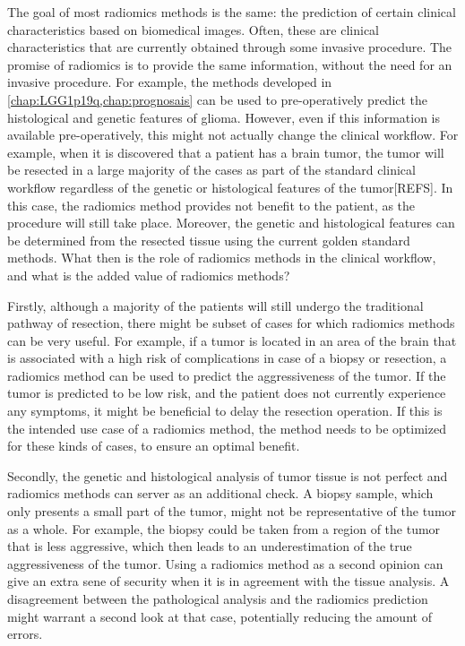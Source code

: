 The goal of most radiomics methods is the same: the prediction of certain clinical characteristics based on biomedical images.
Often, these are clinical characteristics that are currently obtained through some invasive procedure.
The promise of radiomics is to provide the same information, without the need for an invasive procedure.
For example, the methods developed in \cref{chap:LGG1p19q,chap:prognosais} can be used to pre-operatively predict the histological and genetic features of glioma.
However, even if this information is available pre-operatively, this might not actually change the clinical workflow.
For example, when it is discovered that a patient has a brain \gls{tumor}, the tumor will be resected in a large majority of the cases as part of the standard clinical workflow regardless of the genetic or histological features of the tumor[REFS].
In this case, the radiomics method provides not benefit to the patient, as the procedure will still take place.
Moreover, the genetic and histological features can be determined from the resected tissue using the current golden standard methods.
What then is the role of radiomics methods in the clinical workflow, and what is the added value of radiomics methods?

Firstly, although a majority of the patients will still undergo the traditional pathway of resection, there might be subset of cases for which radiomics methods can be very useful.
For example, if a \gls{tumor} is located in an area of the brain that is associated with a high risk of complications in case of a biopsy or resection, a radiomics method can be used to predict the aggressiveness of the \gls{tumor}.
If the \gls{tumor} is predicted to be low risk, and the patient does not currently experience any symptoms, it might be beneficial to delay the resection operation.
If this is the intended use case of a radiomics method, the method needs to be optimized for these kinds of cases, to ensure an optimal benefit.

Secondly, the genetic and histological analysis of \gls{tumor} tissue is not perfect and radiomics methods can server as an additional check.
A biopsy sample, which only presents a small part of the \gls{tumor}, might not be representative of the \gls{tumor} as a whole.
For example, the biopsy could be taken from a region of the tumor that is less aggressive, which then leads to an underestimation of the true aggressiveness of the \gls{tumor}.
Using a radiomics method as a second opinion can give an extra sene of security when it is in agreement with the tissue analysis.
A disagreement between the pathological analysis and the radiomics prediction might warrant a second look at that case, potentially reducing the amount of errors.

